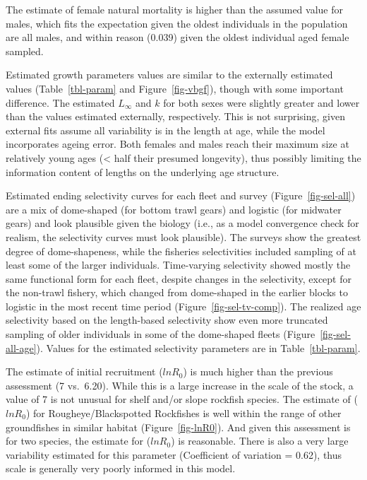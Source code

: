 \documentclass[
]{scrartcl}
\begin{document}
The estimate of female natural mortality is higher than the assumed
value for males, which fits the expectation given the oldest individuals
in the population are all males, and within reason (0.039) given the
oldest individual aged female sampled.

Estimated growth parameters values are similar to the externally
estimated values (Table~\ref{tbl-param} and Figure~\ref{fig-vbgf}),
though with some important difference. The estimated \(L_{\infty}\) and
\(k\) for both sexes were slightly greater and lower than the values
estimated externally, respectively. This is not surprising, given
external fits assume all variability is in the length at age, while the
model incorporates ageing error. Both females and males reach their
maximum size at relatively young ages (\textless{} half their presumed
longevity), thus possibly limiting the information content of lengths on
the underlying age structure.

Estimated ending selectivity curves for each fleet and survey
(Figure~\ref{fig-sel-all}) are a mix of dome-shaped (for bottom trawl
gears) and logistic (for midwater gears) and look plausible given the
biology (i.e., as a model convergence check for realism, the selectivity
curves must look plausible). The surveys show the greatest degree of
dome-shapeness, while the fisheries selectivities included sampling of
at least some of the larger individuals. Time-varying selectivity showed
mostly the same functional form for each fleet, despite changes in the
selectivity, except for the non-trawl fishery, which changed from
dome-shaped in the earlier blocks to logistic in the most recent time
period (Figure~\ref{fig-sel-tv-comp}). The realized age selectivity
based on the length-based selectivity show even more truncated sampling
of older individuals in some of the dome-shaped fleets
(Figure~\ref{fig-sel-all-age}). Values for the estimated selectivity
parameters are in Table~\ref{tbl-param}.

The estimate of initial recruitment (\(lnR_0\)) is much higher than the
previous assessment (7 vs.~6.20). While this is a large increase in the
scale of the stock, a value of 7 is not unusual for shelf and/or slope
rockfish species. The estimate of (\(lnR_0\)) for Rougheye/Blackspotted
Rockfishes is well within the range of other groundfishes in similar
habitat (Figure~\ref{fig-lnR0}). And given this assessment is for two
species, the estimate for (\(lnR_0\)) is reasonable. There is also a
very large variability estimated for this parameter (Coefficient of
variation = 0.62), thus scale is generally very poorly informed in this
model.
\end{document}
